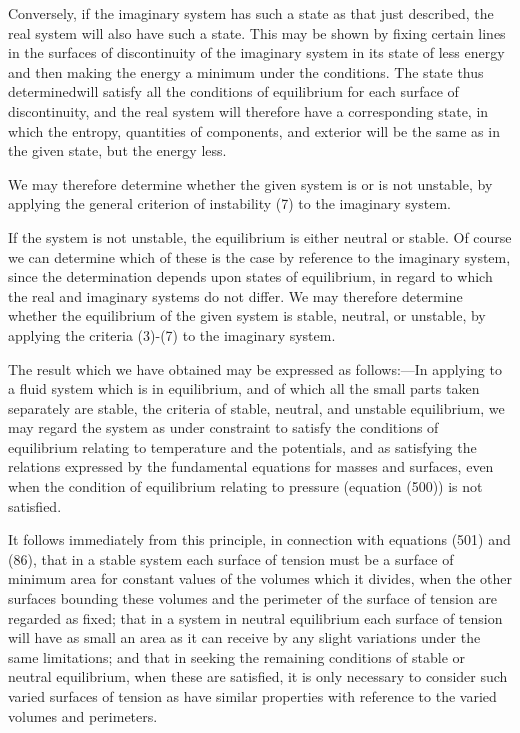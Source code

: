 \documentclass[12pt]{memoir}
\begin{document}
{Conversely, if the imaginary system has such a state as that just described, the real system will also have such a state. This may be shown by fixing certain lines in the surfaces of discontinuity of the imaginary system in its state of less energy and then making the energy a minimum under the conditions. The state thus determinedwill satisfy all the conditions of equilibrium for each surface of discontinuity, and the real system will therefore have a corresponding state, in which the entropy, quantities of components, and exterior will be the same as in the given state, but the energy less.

We may therefore determine whether the given system is or is not unstable, by applying the general criterion of instability (7) to the imaginary system.

If the system is not unstable, the equilibrium is either neutral or stable. Of course we can determine which of these is the case by reference to the imaginary system, since the determination depends upon states of equilibrium, in regard to which the real and imaginary systems do not differ. We may therefore determine whether the equilibrium of the given system is stable, neutral, or unstable, by applying the criteria (3)-(7) to the imaginary system.

The result which we have obtained may be expressed as follows:---In applying to a fluid system which is in equilibrium, and of which all the small parts taken separately are stable, the criteria of stable, neutral, and unstable equilibrium, we may regard the system as under constraint to satisfy the conditions of equilibrium relating to temperature and the potentials, and as satisfying the relations expressed by the fundamental equations for masses and surfaces, even when the condition of equilibrium relating to pressure (equation (500)) is not satisfied.

It follows immediately from this principle, in connection with equations (501) and (86), that in a stable system each surface of tension must be a surface of minimum area for constant values of the volumes which it divides, when the other surfaces bounding these volumes and the perimeter of the surface of tension are regarded as fixed; that in a system in neutral equilibrium each surface of tension will have as small an area as it can receive by any slight variations under the same limitations; and that in seeking the remaining conditions of stable or neutral equilibrium, when these are satisfied, it is only necessary to consider such varied surfaces of tension as have similar properties with reference to the varied volumes and perimeters.

}
\end{document}
